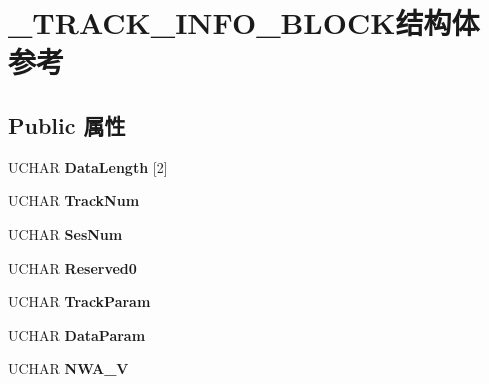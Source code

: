\hypertarget{struct___t_r_a_c_k___i_n_f_o___b_l_o_c_k}{}\section{\+\_\+\+T\+R\+A\+C\+K\+\_\+\+I\+N\+F\+O\+\_\+\+B\+L\+O\+C\+K结构体 参考}
\label{struct___t_r_a_c_k___i_n_f_o___b_l_o_c_k}
\subsection*{Public 属性}
\begin{DoxyCompactItemize}
\item 
\mbox{\label{struct___t_r_a_c_k___i_n_f_o___b_l_o_c_k_a46059574d14faa45d6abcaff7bd0c70c}} 
U\+C\+H\+AR {\bfseries Data\+Length} \mbox{[}2\mbox{]}
\item 
\mbox{\label{struct___t_r_a_c_k___i_n_f_o___b_l_o_c_k_a5527c01ac69214dd91c49b4e639731c2}} 
U\+C\+H\+AR {\bfseries Track\+Num}
\item 
\mbox{\label{struct___t_r_a_c_k___i_n_f_o___b_l_o_c_k_ad35eaddb1acb56c202fe811efd881143}} 
U\+C\+H\+AR {\bfseries Ses\+Num}
\item 
\mbox{\label{struct___t_r_a_c_k___i_n_f_o___b_l_o_c_k_a60fa30e6ec6010f0da29feb7b997b914}} 
U\+C\+H\+AR {\bfseries Reserved0}
\item 
\mbox{\label{struct___t_r_a_c_k___i_n_f_o___b_l_o_c_k_a802028dc980608423d8368bd0699cd3f}} 
U\+C\+H\+AR {\bfseries Track\+Param}
\item 
\mbox{\label{struct___t_r_a_c_k___i_n_f_o___b_l_o_c_k_ad9079ecf6ec2e7e7709b4462dcc5cb5e}} 
U\+C\+H\+AR {\bfseries Data\+Param}
\item 
\mbox{\label{struct___t_r_a_c_k___i_n_f_o___b_l_o_c_k_ade8aa1e3d2867459d4e5d1dddb1d705e}} 
U\+C\+H\+AR {\bfseries N\+W\+A\+\_\+V}
\item 

\end{DoxyCompactItemize}
